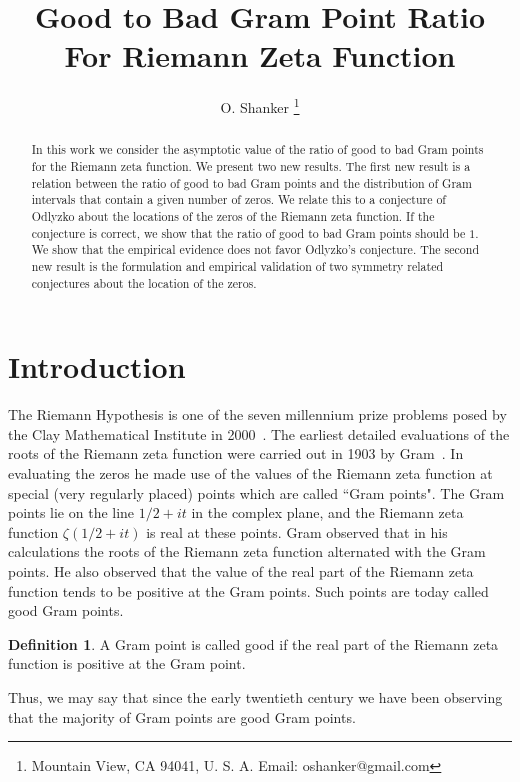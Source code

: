 \documentclass[twoside]{article}
\theoremstyle{definition}
\newtheorem{defn}{Definition}
\begin{document}
\date{}
\lhead[]{}
\chead[]{}
\rhead[]{}

\title{\bf{Good to Bad Gram Point Ratio For Riemann Zeta Function}}
%

\author{O. Shanker 
 \thanks{Mountain View, CA 94041, U. S. A. Email: oshanker@gmail.com
 }
}

\maketitle
\thispagestyle{fancy}

\begin{abstract}
In this work we consider the asymptotic value of the ratio of good to bad Gram points for the Riemann zeta function.
We present two new results. The first new result is a relation between the ratio of good to bad Gram points and the distribution of Gram intervals that contain a given number of zeros.
We relate this to a conjecture of Odlyzko about the locations of the zeros of the Riemann zeta function.
If the conjecture is correct, we show that the ratio of good to bad Gram points should be $1$. 
We show that the empirical evidence does not favor Odlyzko's conjecture. The  second new result is the formulation and empirical validation of two 
symmetry related conjectures about the location of the zeros.
\end{abstract}



{}


\section{Introduction}
The Riemann Hypothesis is one of the seven millennium prize problems posed by the Clay Mathematical Institute in 2000~\cite{Sarnak 2005}. 
The earliest detailed evaluations of the roots of the Riemann zeta function were carried out in 1903 by Gram~\cite{Gram 1903}.
In evaluating the zeros he made use of the values of the Riemann zeta function at special (very regularly placed) points which are called ``Gram points".
The Gram points lie on the line $1/2+it$ in the complex plane, and the Riemann zeta function $\zeta(1/2+it)$ is real at these points. 
Gram observed that in his calculations the roots of the Riemann zeta function alternated with the Gram points. He also observed that the
value of the real part of the Riemann zeta function tends to be positive at the Gram points. Such points are today called good Gram points. 
\begin{defn}\label{good0}
A Gram point is called good if the real part of the Riemann zeta function is positive at the Gram point.
\end{defn}
Thus, we may say that since the early 
twentieth century we have been observing that the majority of Gram points are good Gram points. 
\end{document}
